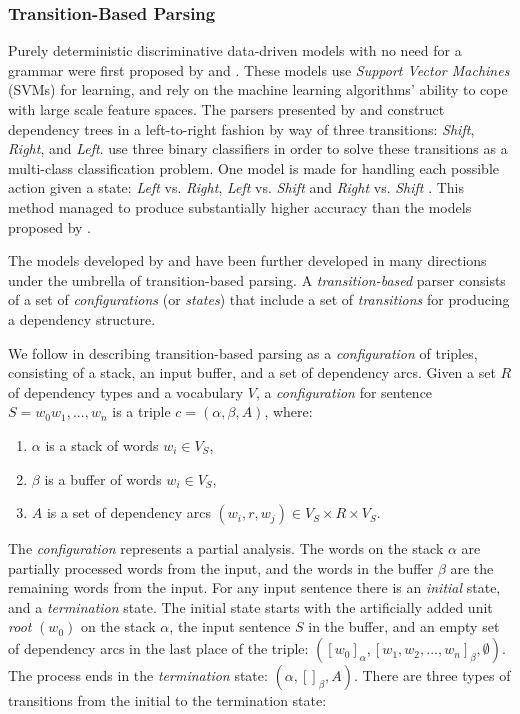 \subsubsection{Transition-Based Parsing}
\label{ssc:background:transition-based}

Purely deterministic discriminative data-driven models with no need for a grammar were first proposed by  and . These models use \textit{Support Vector Machines} (SVMs) for learning, and rely on the machine learning algorithms' ability to cope with large scale feature spaces. The parsers presented by \citeauthor{Kudo:00} and \citeauthor{Yamada:03} construct dependency trees in a left-to-right fashion by way of three transitions: \textit{Shift}, \textit{Right}, and \textit{Left}. \citeauthor{Yamada:03} use three binary classifiers in order to solve these transitions as a multi-class classification problem. One model is made for handling each possible action given a state: \textit{Left} vs. \textit{Right}, \textit{Left} vs. \textit{Shift} and \textit{Right} vs. \textit{Shift} \cite{Yamada:03}. This method managed to produce substantially higher accuracy than the models proposed by .

The models developed by \citeauthor{Kudo:00} and \citeauthor{Yamada:03} have been further developed in many directions under the umbrella of transition-based parsing. A \textit{transition-based} parser consists of a set of \textit{configurations} (or \textit{states}) that include a set of \textit{transitions} for producing a dependency structure.

We follow  in describing transition-based parsing as a \textit{configuration} of triples, consisting of a stack, an input buffer, and a set of dependency arcs. Given a set $R$ of dependency types and a vocabulary $V$, a \textit{configuration} for sentence $S = w_0w_1, ..., w_n$ is a triple $c = (\alpha, \beta, A)$, where:

\begin{enumerate}
\item $\alpha$ is a stack of words $w_i \in V_S$,
\item $\beta$ is a buffer of words $w_i \in V_S$,
\item $A$ is a set of dependency arcs $(w_i, r, w_j) \in V_S \times R \times V_S$.
\end{enumerate}

The \textit{configuration} represents a partial analysis. The words on the stack $\alpha$ are partially processed words from the input, and the words in the buffer $\beta$ are the remaining words from the input. For any input sentence there is an \textit{initial} state, and a \textit{termination} state. The initial state starts with the artificially added unit \textit{root} $(w_0)$ on the stack $\alpha$, the input sentence $S$ in the buffer, and an empty set of dependency arcs in the last place of the triple: $([w_0]_\alpha, [w_1, w_2, ..., w_n]_\beta, \emptyset)$. The process ends in the \textit{termination} state: $(\alpha, []_\beta, A)$. There are three types of transitions from the initial to the termination state:

